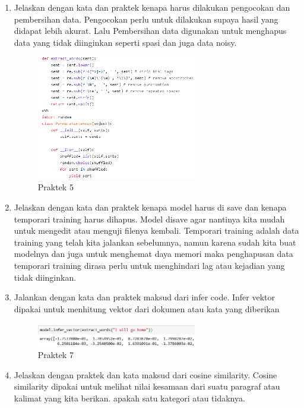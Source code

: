 \begin{enumerate}
	\item Jelaskan dengan kata dan praktek kenapa harus dilakukan pengocokan dan pembersihan data.
	\hfill\break
	Pengocokan perlu untuk dilakukan supaya hasil yang didapat lebih akurat. Lalu Pembersihan data digunakan untuk menghapus data yang tidak diinginkan seperti spasi dan juga data noisy. 
		\begin{figure}[H]
			\includegraphics[width=7cm]{figures/1174079/5/24.png}
			\centering
			\caption{Praktek 5}
		\end{figure}
	\item Jelaskan dengan kata dan praktek kenapa model harus di save dan kenapa temporari training harus dihapus.
	\hfill\break
	Model disave agar nantinya kita mudah untuk mengedit atau menguji filenya kembali. Temporari training adalah data training yang telah kita jalankan sebelumnya, namun karena sudah kita buat modelnya dan juga untuk menghemat daya memori maka penghapusan data temporari training dirasa perlu untuk menghindari lag atau kejadian yang tidak diinginkan.
		
			
	\item Jalankan dengan kata dan praktek maksud dari infer code.
	\hfill\break
	Infer vektor dipakai untuk menhitung vektor dari dokumen atau kata yang diberikan
		\begin{figure}[H]
			\includegraphics[width=7cm]{figures/1174079/5/26.png}
			\centering
			\caption{Praktek 7}
		\end{figure}

	\item Jelaskan dengan praktek dan kata maksud dari cosine similarity.
	Cosine similarity dipakai untuk melihat nilai kesamaan dari suatu paragraf atau kalimat yang kita berikan. apakah satu kategori atau tidaknya.
	\hfill\break
	

\end{enumerate}
